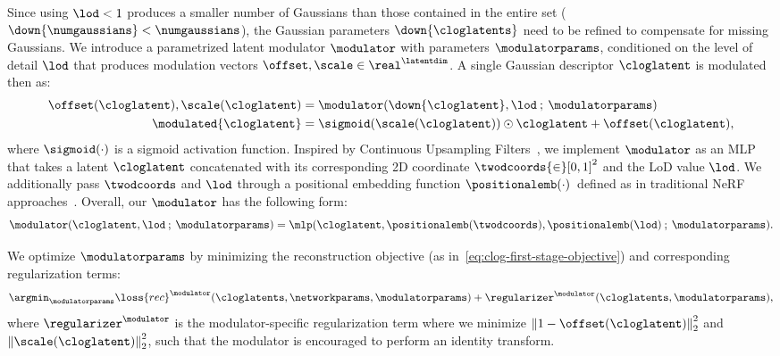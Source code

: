 Since using $\lod < 1$ produces
    a smaller number of Gaussians than those contained in the entire set
    ($\down{\numgaussians} < \numgaussians$), the Gaussian parameters
    $\down{\cloglatents}$ need to be refined to compensate for missing
    Gaussians.
    We introduce a parametrized latent modulator $\modulator$ with parameters
    $\modulatorparams$, conditioned on the level of detail $\lod$ that
    produces modulation vectors $\offset, \scale\in\real^\latentdim$.
    A single Gaussian descriptor $\cloglatent$ is modulated then as:
    \begin{align}
      \label{eq:clog-modulating}
      \offset(\cloglatent), \scale(\cloglatent) & = \modulator(\down{\cloglatent}, \lod\:;\: \modulatorparams )             \\
      \modulated{\cloglatent}                   & = \sigmoid(\scale(\cloglatent)) \odot \cloglatent + \offset(\cloglatent),
    \end{align}
    where $\sigmoid(\cdot)$ is a sigmoid activation function.
    Inspired by Continuous Upsampling Filters~\cite{vasconcelos2023cuf}, we
    implement $\modulator$ as an MLP that takes a latent $\cloglatent$
    concatenated with its corresponding 2D coordinate $\twodcoords{\in}[0,
    1]^2$ and the LoD value $\lod$.
    We additionally pass $\twodcoords$ and $\lod$ through a positional
    embedding function $\positionalemb(\cdot)$~defined as in traditional NeRF
    approaches~\cite{mildenhall2020nerf}.
    Overall, our $\modulator$ has the following form:
    \begin{equation}
      \label{eq:clog-modulator}
      \modulator(\cloglatent, \lod\:;\:\modulatorparams) = \mlp(\cloglatent, \positionalemb(\twodcoords), \positionalemb(\lod) \:;\:\modulatorparams).
    \end{equation}

    We optimize $\modulatorparams$ by minimizing the reconstruction objective (as in~\cref{eq:clog-first-stage-objective}) and corresponding regularization terms:
    \begin{equation}
      \argmin_{\modulatorparams} \loss{rec}^\modulator(\cloglatents, \networkparams, \modulatorparams)  + \regularizer^\modulator(\cloglatents, \modulatorparams),
    \end{equation}
    where $\regularizer^\modulator$ is the modulator-specific regularization term where we minimize $\left\|1 - \offset(\cloglatent)\right\|_2^2$ and $\left\|\scale(\cloglatent)\right\|_2^2$, such that the modulator is encouraged to perform an identity transform.

